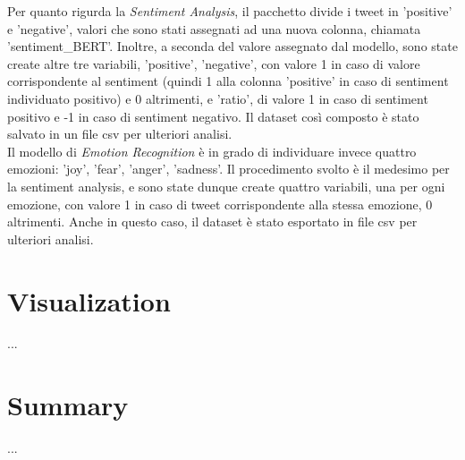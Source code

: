 \documentclass[12pt,journal,compsoc]{IEEEtran}
\begin{document}

Per quanto rigurda la \textit{Sentiment Analysis}, il pacchetto divide i tweet in 'positive' e 'negative', valori che sono stati assegnati ad una nuova colonna, chiamata 'sentiment\_BERT'. Inoltre, a seconda del valore assegnato dal modello, sono state create altre tre variabili, 'positive', 'negative', con valore 1 in caso di valore corrispondente al sentiment (quindi 1 alla colonna 'positive' in caso di sentiment individuato positivo) e 0 altrimenti, e 'ratio', di valore 1 in caso di sentiment positivo e -1 in caso di sentiment negativo. Il dataset così composto è stato salvato in un file csv per ulteriori analisi.\\
Il modello di \textit{Emotion Recognition} è in grado di individuare invece quattro emozioni: 'joy', 'fear', 'anger', 'sadness'. Il procedimento svolto è il medesimo per la sentiment analysis, e sono state dunque create quattro variabili, una per ogni emozione, con valore 1 in caso di tweet corrispondente alla stessa emozione, 0 altrimenti. Anche in questo caso, il dataset è stato esportato in file csv per ulteriori analisi.

\section{Visualization}
...

\section{Summary}
...




\nocite{*}
\printbibliography
\end{document}
